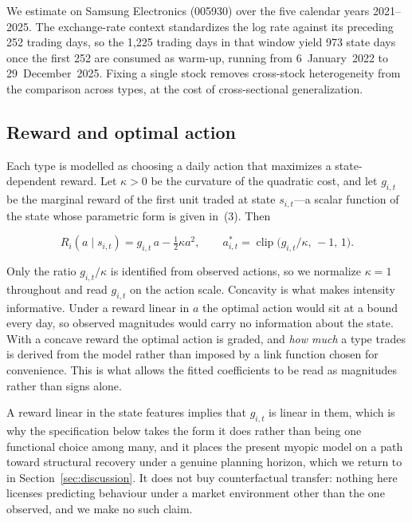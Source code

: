 \documentclass[sigconf,anonymous,review]{acmart}
\begin{document}
We estimate on Samsung Electronics (005930) over the five calendar years
2021--2025. The exchange-rate context standardizes the log rate against
its preceding 252 trading days, so the 1{,}225 trading days in that
window yield 973 state days once the first 252 are consumed as warm-up,
running from 6~January~2022 to 29~December~2025. Fixing a single stock removes
cross-stock heterogeneity from the comparison across types, at the cost
of cross-sectional generalization.

\subsection{Reward and optimal action}
\label{sec:method-reward}

Each type is modelled as choosing a daily action that maximizes a
state-dependent reward. Let $\kappa > 0$ be the curvature of the quadratic
cost, and let $g_{i,t}$ be the marginal reward of the first unit traded at
state $s_{i,t}$---a scalar function of the state whose parametric form is
given in~(3). Then

\begin{equation}
  R_i(a \mid s_{i,t}) = g_{i,t}\, a - \tfrac{1}{2}\kappa a^2,
  \qquad
  a^{*}_{i,t} = \operatorname{clip}\!\bigl(g_{i,t}/\kappa,\, -1,\, 1\bigr).
\end{equation}

Only the ratio $g_{i,t}/\kappa$ is identified from observed actions, so we
normalize $\kappa = 1$ throughout and read $g_{i,t}$ on the action scale.
Concavity is what makes intensity
informative. Under a reward linear in $a$ the optimal action would sit at
a bound every day, so observed magnitudes would carry no information
about the state. With a concave reward the optimal action is graded, and
\emph{how much} a type trades is derived from the model rather than
imposed by a link function chosen for convenience. This is what allows
the fitted coefficients to be read as magnitudes rather than signs alone.

A reward linear in the state features implies that $g_{i,t}$ is linear in
them, which is why the specification below takes the form it does rather than
being one functional choice among many, and it places the present myopic
model on a path toward structural recovery under a genuine planning
horizon, which we return to in Section~\ref{sec:discussion}. It does not
buy counterfactual transfer:
nothing here licenses predicting behaviour under a market environment
other than the one observed, and we make no such claim.
\end{document}
